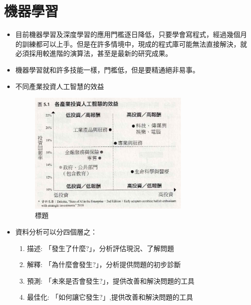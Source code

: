 \documentclass[a4paper,12pt]{article}
\begin{document}
\section{機器學習}
\label{sec:org2965ae6}
\begin{itemize}
\item 目前機器學習及深度學習的應用門檻逐日降低，只要學會寫程式，經過幾個月的訓練都可以上手。但是在許多情境中，現成的程式庫可能無法直接解決，就必須採用較進階的演算法，甚至是最新的研究成果。\\
\item 機器學習就和許多技能一樣，門檻低，但是要精通絕非易事。\\
\item 不同產業投資人工智慧的效益\\
\begin{figure}[htbp]
\centering
\includegraphics[width=300]{images/機器學習/2023-01-25_01-12-16_Scan 4.jpeg}
\caption{\label{fig:Name}標題}
\end{figure}
\item 資料分析可以分四個層之：\\
\begin{enumerate}
\item 描述: 「發生了什麼?」，分析評估現況、了解問題\\
\item 解釋: 「為什麼會發生?」，分析提供問題的初步診斷\\
\item 預測: 「未來是否會發生?」，提供改善和解決問題的工具\\
\item 最佳化: 「如何讓它發生?」,提供改善和解決問題的工具\\

\end{enumerate}
\end{itemize}
\end{document}
